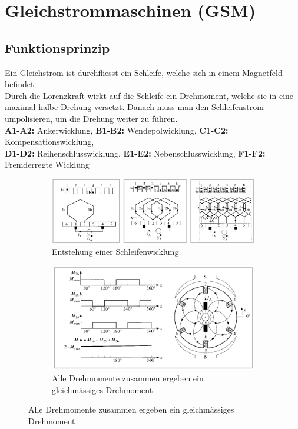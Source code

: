 \section{Gleichstrommaschinen (GSM)}
    \subsection{Funktionsprinzip}
    Ein Gleichstrom ist durchfliesst ein Schleife, welche sich in einem Magnetfeld befindet. \\
    Durch die Lorenzkraft wirkt auf die Schleife ein Drehmoment, welche sie in eine maximal halbe Drehung versetzt.
    Danach muss man den Schleifenstrom umpolisieren, um die Drehung weiter zu führen. \\
    \textbf{A1-A2:} Ankerwicklung, \textbf{B1-B2:} Wendepolwicklung, \textbf{C1-C2:} Kompensationswicklung, \\
    \textbf{D1-D2:} Reihenschlusswicklung, \textbf{E1-E2:} Nebenschlusswicklung, \textbf{F1-F2:} Fremderregte Wicklung \\
    \begin{figure}
	    \centering
	    \begin{subfigure}[t]{0.45\textwidth}
	    	\centering
	    	\includegraphics[width=\textwidth]{images/GSM_Wicklungen.png}
	    	\caption{Entstehung einer Schleifenwicklung}
	    \end{subfigure}
	    \begin{subfigure}[t]{0.45\textwidth}
	    	\centering
	    	\includegraphics[width=\textwidth]{images/GSM_Drehmomentdarstellung.png}
	    	\caption{Alle Drehmomente zusammen ergeben ein gleichmässiges Drehmoment}
	    \end{subfigure}
    \end{figure}

